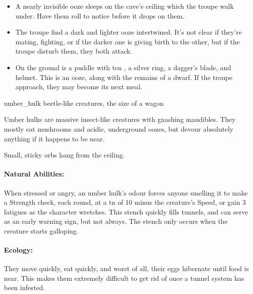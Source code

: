 \begin{multicols}{2}
\showEnc

\begin{itemize}
  \item
  A nearly invisible ooze sleeps on the cave's ceiling which the troupe walk under.
  Have them roll  to notice before it drops on them.
  \item
  The troupe find a dark and lighter ooze intertwined.
  It's not clear if they're mating, fighting, or if the darker one is giving birth to the other, but if the troupe disturb them, they both attack.
  \item
  On the ground is a puddle with ten , a silver ring, a dagger's blade, and helmet.
  This is an ooze, along with the remains of a dwarf.
  If the troupe approach, they may become its next meal.
\end{itemize}

\jelly

  {umber_hulk}%
  {beetle-like creatures, the size of a wagon}%

Umber hulks are massive insect-like creatures with gnashing mandibles.
They mostly eat mushrooms and acidic, underground oozes, but devour absolutely anything if it happens to be near.

\begin{boxtext}

  Small, sticky orbs hang from the ceiling.

\end{boxtext}

\paragraph{Natural Abilities:} When stressed or angry, an umber hulk's odour forces anyone smelling it to make a Strength check, each round, at a \gls{tn} of 10 minus the creature's Speed, or gain 3 \glspl{fatigue} as the character wretches.
This stench quickly fills tunnels, and can serve as an early warning sign, but not always.
The stench only occurs when the creature starts galloping.

\paragraph{Ecology:}
They move quickly, eat quickly, and worst of all, their eggs hibernate until food is near.
This makes them extremely difficult to get rid of once a tunnel system has been infested.


\end{multicols}
